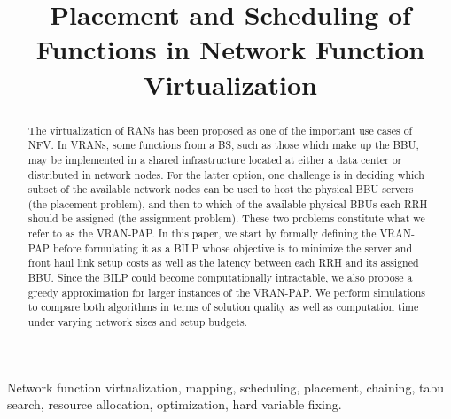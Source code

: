 \documentclass[conference]{IEEEtran}
\begin{document}
\title{Placement and Scheduling of Functions in Network Function Virtualization}

\author{
}

\maketitle

\begin{abstract}
The virtualization of \acp{RAN} has been proposed as one of the important use cases of \ac{NFV}. In \acp{VRAN}, some functions from a \ac{BS}, such as those which make up the \ac{BBU}, may be implemented in a shared infrastructure located at either a data center or distributed in network nodes. For the latter option, one challenge is in deciding which subset of the available network nodes can be used to host the physical \ac{BBU} servers (the placement problem), and then to which of the available physical \acp{BBU} each \ac{RRH} should be assigned (the assignment problem). These two problems constitute what we refer to as the \ac{VRAN-PAP}. In this paper, we start by formally defining the \ac{VRAN-PAP} before formulating it as a \ac{BILP} whose objective is to minimize the server and front haul link setup costs as well as the latency between each \ac{RRH} and its assigned \ac{BBU}. Since the \ac{BILP} could become computationally intractable, we also propose a greedy approximation for larger instances of the \ac{VRAN-PAP}. We perform simulations to compare both algorithms in terms of solution quality as well as computation time under varying network sizes and setup budgets.
\end{abstract}

\begin{IEEEkeywords}
Network function virtualization, mapping, scheduling, placement, chaining, tabu search, resource allocation, optimization, hard variable fixing.
\end{IEEEkeywords}
\end{document}
